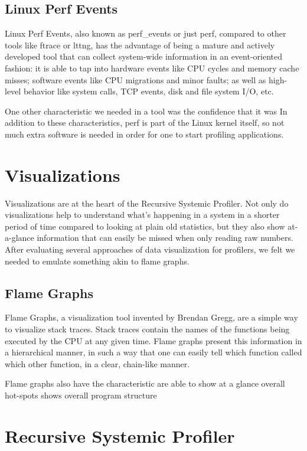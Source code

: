 \documentclass[10pt]{article}
\begin{document}
\subsection{Linux Perf Events}

Linux Perf Events, also known as perf\_events or just perf, compared to other tools like ftrace or lttng, has the advantage of being a mature and actively developed tool that can collect system-wide information in an event-oriented fashion: it is able to tap into hardware events like CPU cycles and memory cache misses; software events like CPU migrations and minor faults; as well as high-level behavior like system calls, TCP events, disk and file system I/O, etc.

One other characteristic we needed in a tool was the confidence that it was  In addition to these characteristics, perf is part of the Linux kernel itself, so not much extra software is needed in order for one to start profiling applications.

\section{Visualizations}
Visualizations are at the heart of the Recursive Systemic Profiler. Not only do visualizations help to understand what's happening in a system in a shorter period of time compared to looking at plain old statistics, but they also show at-a-glance information that can easily be missed when only reading raw numbers. After evaluating several approaches of data visualization for profilers, we felt we needed to emulate something akin to flame graphs.

\subsection{Flame Graphs}
Flame Graphs, a visualization tool invented by Brendan Gregg, are a simple way to visualize stack traces. Stack traces contain the names of the functions being executed by the CPU at any given time. Flame graphs present this information in a hierarchical manner, in such a way that one can easily tell which function called which other function, in a clear, chain-like manner.

Flame graphs also have the characteristic  are able to show at a glance overall hot-spots shows overall program structure


\section{Recursive Systemic Profiler}
\end{document}
